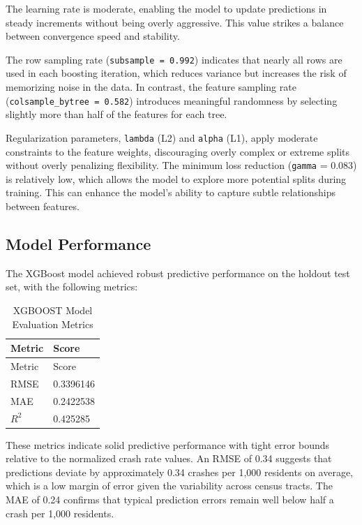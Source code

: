 \documentclass[
  number,
  review,
  3p]{elsarticle}
\begin{document}
The learning rate is moderate, enabling the model to update predictions
in steady increments without being overly aggressive. This value strikes
a balance between convergence speed and stability.

The row sampling rate (\texttt{subsample\ =\ 0.992}) indicates that
nearly all rows are used in each boosting iteration, which reduces
variance but increases the risk of memorizing noise in the data. In
contrast, the feature sampling rate
(\texttt{colsample\_bytree\ =\ 0.582}) introduces meaningful randomness
by selecting slightly more than half of the features for each tree.

Regularization parameters, \texttt{lambda} (L2) and \texttt{alpha} (L1),
apply moderate constraints to the feature weights, discouraging overly
complex or extreme splits without overly penalizing flexibility. The
minimum loss reduction (\texttt{gamma} = 0.083) is relatively low, which
allows the model to explore more potential splits during training. This
can enhance the model's ability to capture subtle relationships between
features.

\subsection{\texorpdfstring{\textbf{Model
Performance}}{Model Performance}}\label{model-performance}

The XGBoost model achieved robust predictive performance on the holdout
test set, with the following metrics:

\begin{longtable}[]{@{}ll@{}}
\caption{XGBOOST Model Evaluation Metrics}\tabularnewline
\toprule\noalign{}
Metric & Score \\
\midrule\noalign{}
\endfirsthead
\toprule\noalign{}
Metric & Score \\
\midrule\noalign{}
\endhead
\bottomrule\noalign{}
\endlastfoot
RMSE & 0.3396146 \\
MAE & 0.2422538 \\
\(R^2\) & 0.425285 \\
\end{longtable}

These metrics indicate solid predictive performance with tight error
bounds relative to the normalized crash rate values. An RMSE of 0.34
suggests that predictions deviate by approximately 0.34 crashes per
1,000 residents on average, which is a low margin of error given the
variability across census tracts. The MAE of 0.24 confirms that typical
prediction errors remain well below half a crash per 1,000 residents.
\end{document}

